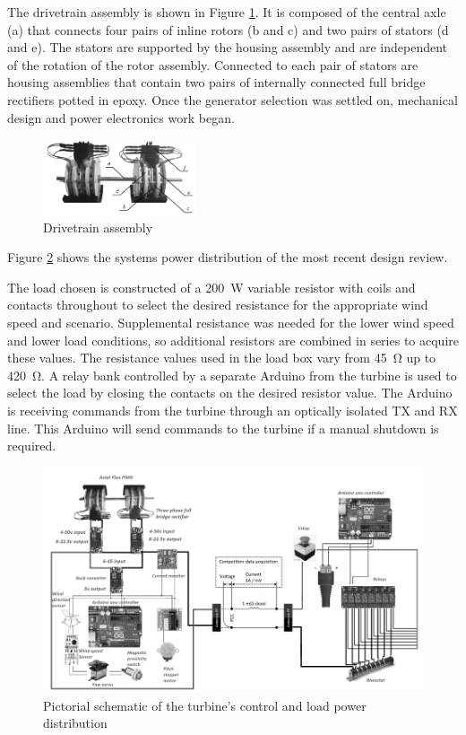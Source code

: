 \documentclass[../ewet_cwc_report.tex]{subfiles}
\begin{document}
The drivetrain assembly is shown in Figure \ref{img:drivetrain}.
It is composed of the central axle (a) that connects four pairs
of inline rotors (b and c) and two pairs of stators (d and e).
The stators are supported by the housing assembly and are
independent of the rotation of the rotor assembly. Connected to
each pair of stators are housing assemblies that contain two
pairs of internally connected full bridge rectifiers potted in
epoxy. Once the generator selection was settled on, mechanical
design and power electronics work began.
\begin{figure}[th]
  \centering
  \includegraphics[width=0.4\textwidth]{../_images/drivetrain.png}
  \caption{Drivetrain assembly}
  \label{img:drivetrain}
\end{figure}

Figure \ref{img:schematic} shows the systems power distribution
of the most recent design review.

The load chosen is constructed of a \qty{200}{\W} variable
resistor with coils and contacts throughout to select the
desired resistance for the appropriate wind speed and
scenario. Supplemental resistance was needed for the lower wind
speed and lower load conditions, so additional resistors are
combined in series to acquire these values. The resistance
values used in the load box vary from \qty{45}{\ohm} up to
\qty{420}{\ohm}. A relay bank controlled by a separate Arduino
from the turbine is used to select the load by closing the
contacts on the desired resistor value. The Arduino is
receiving commands from the turbine through an optically
isolated TX and RX line. This Arduino will send commands to
the turbine if a manual shutdown is required.
\begin{figure}[bh]
  \centering
  \includegraphics[width=\textwidth]{../_images/schematic.png}
  \caption{Pictorial schematic of the turbine's control and load
    power distribution}
  \label{img:schematic}
\end{figure}
\end{document}
